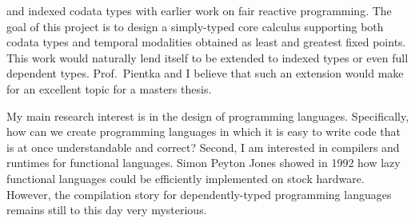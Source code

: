\documentclass[11pt,letterpaper]{article}
\begin{document}
and indexed codata types with earlier work on fair reactive
programming\footnotemark.
The goal of this project is to design a simply-typed core calculus supporting
both codata types and temporal modalities obtained as least and greatest fixed
points.
This work would naturally lend itself to be extended to indexed types or even
full dependent types. Prof.~Pientka and I believe that such an extension would
make for an excellent topic for a masters thesis.
%
%

My main research interest is in the design of programming languages.
Specifically, how can we create programming languages in which it is easy to
write code that is at once understandable and correct?
Second, I am interested in compilers and runtimes for functional languages.
Simon Peyton Jones showed in 1992 how lazy functional languages could be
efficiently implemented on stock hardware. However, the compilation story for
dependently-typed programming languages remains still to this day very
mysterious.
\end{document}
